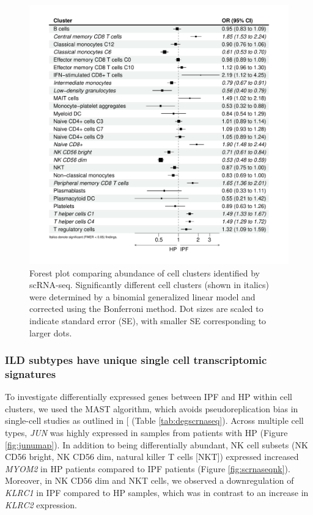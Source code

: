 \documentclass[
]{article}
\begin{document}
\begin{figure}
\includegraphics[width=1\linewidth,]{./Figures/scRNAseq/SCAILD_forestplot} \caption[scRNA-seq cell abundance]{Forest plot comparing abundance of cell clusters identified by scRNA-seq. Significantly different cell clusters (shown in italics) were determined by a binomial generalized linear model and corrected using the Bonferroni method. Dot sizes are scaled to indicate standard error (SE), with smaller SE corresponding to larger dots.}\label{fig:forestplot}
\end{figure}

\subsubsection{ILD subtypes have unique single cell transcriptomic signatures}\label{ild-subtypes-have-unique-single-cell-transcriptomic-signatures}

To investigate differentially expressed genes between IPF and HP within cell clusters, we used the MAST algorithm, which avoids pseudoreplication bias in single-cell studies as outlined in {[}\citeproc{ref-zimmerman_practical_2021}{166}{]} (Table \ref{tab:degscrnaseq}). Across multiple cell types, \textit{JUN} was highly expressed in samples from patients with HP (Figure \ref{fig:junumap}). In addition to being differentially abundant, NK cell subsets (NK CD56 bright, NK CD56 dim, natural killer T cells {[}NKT{]}) expressed increased \textit{MYOM2} in HP patients compared to IPF patients (Figure \ref{fig:scrnaseqnk}). Moreover, in NK CD56 dim and NKT cells, we observed a downregulation of \textit{KLRC1} in IPF compared to HP samples, which was in contrast to an increase in \textit{KLRC2} expression.
\end{document}
